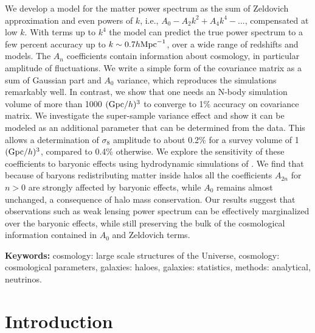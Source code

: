 \documentclass[
  11pt,
  twoside,
  openright,
  titlepage,
  headings=optiontoheadandtoc
]{scrbook}
\begin{document}
\begin{paperabstract}

We develop a model for the matter power spectrum as the sum of Zeldovich approximation and even powers of $k$, i.e., $A_0 - A_2k^2 + A_4k^4 - ...$, compensated at low $k$. With terms up to $k^4$ the model can predict the true power spectrum to a few percent accuracy up to $k\sim 0.7 h \rm{Mpc}^{-1}$, over a wide range of redshifts and models. 
The $A_n$ coefficients  contain information about cosmology, in particular amplitude of fluctuations.  
We write a simple form of the covariance matrix as a sum of Gaussian part and $A_0$ variance, which reproduces the simulations remarkably well. In contrast, we show that one needs an N-body simulation volume of more than 1000 $({\rm Gpc}/h)^3$ to converge to 
1\% accuracy on covariance matrix. We investigate the super-sample variance effect and show it can be modeled as an additional parameter that can be determined from the data. This allows a determination of $\sigma_8$ amplitude to about 0.2\% for a survey volume of 1$({\rm Gpc}/h)^3$, compared to 0.4\% otherwise.
We explore the sensitivity of these coefficients to baryonic effects using hydrodynamic simulations of \cite{2011MNRAS.415.3649V}. We find that because of baryons redistributing matter inside halos all the coefficients $A_{2n}$ for $n>0$ are strongly affected by baryonic effects, while $A_0$ remains almost unchanged, a consequence of halo mass conservation. Our results suggest that observations such as weak lensing power spectrum can be effectively marginalized over the baryonic effects, while still preserving the bulk of the cosmological information contained in $A_0$ and Zeldovich terms.  
 

\end{paperabstract}


\vspace{1em}
\noindent\textbf{Keywords:} 
cosmology: large scale structures of the Universe,
cosmology: cosmological parameters,
galaxies: haloes,
galaxies: statistics,
methods: analytical,
neutrinos.
\par
\vspace{1em}

\section{Introduction}\label{p2:sec:intro}
\end{document}
